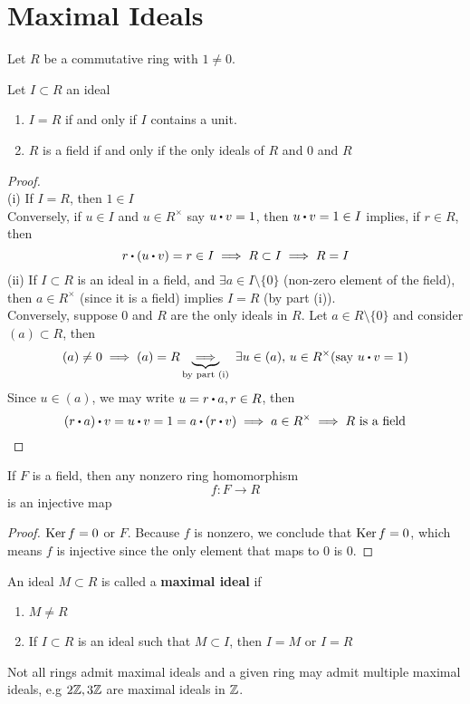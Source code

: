 \documentclass[../Main.tex]{subfiles}
\begin{document}
\chapter{Maximal Ideals}
Let $R$ be a commutative ring with $1\ne 0$.
\begin{prop}[title = Ideals containing units]
	Let $I\subset R$ an ideal
	\begin{enumerate}
		\item $I=R$ if and only if $I$ contains a unit.
		\item $R$ is a field if and only if the only ideals of $R$ and $0$ and $R$
	\end{enumerate}
\end{prop}
\begin{proof}~\\
	(i) If $I=R$, then $1\in I$\\
	Conversely, if $u\in I$ and $u\in R^\times$ say $u\rdot v=1$, then $u\rdot v=1\in I$ implies, if $r \in R$, then 
	\[r\rdot (u\rdot v)=r\in I \implies R\subset I \implies R=I\]
	(ii) If $I\subset R$ is an ideal in a field, and $\exists a \in I \setminus \{0\}$ (non-zero element of the field), then $a\in R^\times$ (since it is a field) implies $I=R$ (by part (i)).\\
	Conversely, suppose $0$ and $R$ are the only ideals in $R$. Let $a\in R\setminus \{0\}$ and consider $(a)\subset R$, then
	\[(a)\ne 0 \implies (a)=R \underbrace{\implies}_{\text{by part (i)}} \,\,\exists u\in (a), \, u \in R^\times (\text{say } u\rdot v=1)\]
	Since $u\in (a)$, we may write $u=r\rdot a, r\in R$, then
	\[(r\rdot a)\rdot v=u\rdot v=1=a\rdot (r\rdot v)\implies a\in R^\times \implies R \text{ is a field}\]
\end{proof}
\begin{crl}[title = Homomorphism from field to ring is injective]
	If $F$ is a field, then any nonzero ring homomorphism
	\[f: F\to R\]
	is an injective map
\end{crl}
\begin{proof}
	$\operatorname{Ker} f =0$ or $F$. Because $f$ is nonzero, we conclude that $\operatorname{Ker} f =0$, which means $f$ is injective since the only element that maps to $0$ is $0$.
\end{proof}
\begin{dfn}[title = Maximal Ideal]
	An ideal $M\subset R$ is called a \textbf{maximal ideal} if
	\begin{enumerate}
		\item $M\ne R$
		\item If $I\subset R$ is an ideal such that $M\subset I$, then $I=M$ or $I=R$
	\end{enumerate}
\end{dfn}
Not all rings admit maximal ideals and a given ring may admit multiple maximal ideals, e.g $2\mathbb{Z},3\mathbb{Z}$ are maximal ideals in $\mathbb{Z}$.
\newpage
\end{document}
